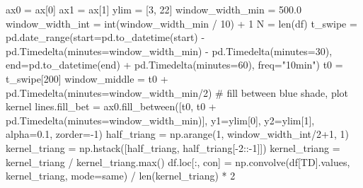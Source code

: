 \documentclass[
  letterpaper,
  DIV=11,
  numbers=noendperiod,
  oneside]{scrreprt}
\newenvironment{Shaded}{\begin{snugshade}}{\end{snugshade}}
\newcommand{\BuiltInTok}[1]{\textcolor[rgb]{0.00,0.23,0.31}{#1}}
\newcommand{\CommentTok}[1]{\textcolor[rgb]{0.37,0.37,0.37}{#1}}
\newcommand{\DecValTok}[1]{\textcolor[rgb]{0.68,0.00,0.00}{#1}}
\newcommand{\FloatTok}[1]{\textcolor[rgb]{0.68,0.00,0.00}{#1}}
\newcommand{\NormalTok}[1]{\textcolor[rgb]{0.00,0.23,0.31}{#1}}
\newcommand{\OperatorTok}[1]{\textcolor[rgb]{0.37,0.37,0.37}{#1}}
\newcommand{\StringTok}[1]{\textcolor[rgb]{0.13,0.47,0.30}{#1}}
\begin{document}
\begin{Shaded}
\begin{Highlighting}[]
\NormalTok{ax0 }\OperatorTok{=}\NormalTok{ ax[}\DecValTok{0}\NormalTok{]}
\NormalTok{ax1 }\OperatorTok{=}\NormalTok{ ax[}\DecValTok{1}\NormalTok{]}
\NormalTok{ylim }\OperatorTok{=}\NormalTok{ [}\DecValTok{3}\NormalTok{, }\DecValTok{22}\NormalTok{]}
\NormalTok{window\_width\_min }\OperatorTok{=} \FloatTok{500.0}
\NormalTok{window\_width\_int }\OperatorTok{=} \BuiltInTok{int}\NormalTok{(window\_width\_min }\OperatorTok{/} \DecValTok{10}\NormalTok{) }\OperatorTok{+} \DecValTok{1}
\NormalTok{N }\OperatorTok{=} \BuiltInTok{len}\NormalTok{(df)}
\NormalTok{t\_swipe }\OperatorTok{=}\NormalTok{ pd.date\_range(start}\OperatorTok{=}\NormalTok{pd.to\_datetime(start) }\OperatorTok{{-}}\NormalTok{ pd.Timedelta(minutes}\OperatorTok{=}\NormalTok{window\_width\_min) }\OperatorTok{{-}}\NormalTok{ pd.Timedelta(minutes}\OperatorTok{=}\DecValTok{30}\NormalTok{),}
\NormalTok{                        end}\OperatorTok{=}\NormalTok{pd.to\_datetime(end) }\OperatorTok{+}\NormalTok{ pd.Timedelta(minutes}\OperatorTok{=}\DecValTok{60}\NormalTok{),}
\NormalTok{                        freq}\OperatorTok{=}\StringTok{"10min"}\NormalTok{)}
\NormalTok{t0 }\OperatorTok{=}\NormalTok{ t\_swipe[}\DecValTok{200}\NormalTok{]}
\NormalTok{window\_middle }\OperatorTok{=}\NormalTok{ t0 }\OperatorTok{+}\NormalTok{ pd.Timedelta(minutes}\OperatorTok{=}\NormalTok{window\_width\_min}\OperatorTok{/}\DecValTok{2}\NormalTok{)}
\CommentTok{\# fill between blue shade, plot kernel}
\NormalTok{lines.fill\_bet }\OperatorTok{=}\NormalTok{ ax0.fill\_between([t0, t0 }\OperatorTok{+}\NormalTok{ pd.Timedelta(minutes}\OperatorTok{=}\NormalTok{window\_width\_min)],}
\NormalTok{                                           y1}\OperatorTok{=}\NormalTok{ylim[}\DecValTok{0}\NormalTok{], y2}\OperatorTok{=}\NormalTok{ylim[}\DecValTok{1}\NormalTok{], alpha}\OperatorTok{=}\FloatTok{0.1}\NormalTok{, zorder}\OperatorTok{={-}}\DecValTok{1}\NormalTok{)}
\NormalTok{half\_triang }\OperatorTok{=}\NormalTok{ np.arange(}\DecValTok{1}\NormalTok{, window\_width\_int}\OperatorTok{/}\DecValTok{2}\OperatorTok{+}\DecValTok{1}\NormalTok{, }\DecValTok{1}\NormalTok{)}
\NormalTok{kernel\_triang }\OperatorTok{=}\NormalTok{ np.hstack([half\_triang, half\_triang[}\OperatorTok{{-}}\DecValTok{2}\NormalTok{::}\OperatorTok{{-}}\DecValTok{1}\NormalTok{]])}
\NormalTok{kernel\_triang }\OperatorTok{=}\NormalTok{ kernel\_triang }\OperatorTok{/}\NormalTok{ kernel\_triang.}\BuiltInTok{max}\NormalTok{()}
\NormalTok{df.loc[:, }\StringTok{\textquotesingle{}con\textquotesingle{}}\NormalTok{] }\OperatorTok{=}\NormalTok{ np.convolve(df[}\StringTok{\textquotesingle{}TD\textquotesingle{}}\NormalTok{].values, kernel\_triang, mode}\OperatorTok{=}\StringTok{\textquotesingle{}same\textquotesingle{}}\NormalTok{) }\OperatorTok{/} \BuiltInTok{len}\NormalTok{(kernel\_triang) }\OperatorTok{*} \DecValTok{2}

\end{Highlighting}
\end{Shaded}
\end{document}
